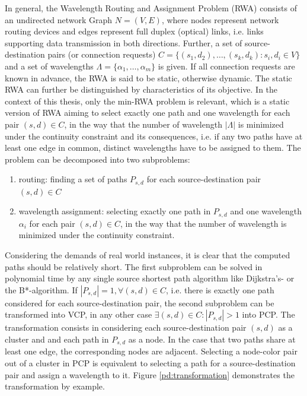 In general, the Wavelength Routing and Assignment Problem (RWA) consists of an undirected network Graph $N=(V,E)$, where nodes represent network routing devices and edges represent full duplex (optical) links, i.e. links supporting data transmission in both directions. Further, a set of source-destination pairs (or connection requests) $C=\{(s_1,d_2),\ldots , (s_k, d_k) : s_i,d_i \in V\}$ and a set of wavelengths $\Lambda = \{\alpha_1 , \ldots, \alpha_m \}$ is given. If all connection requests are known in advance, the RWA is said to be static, otherwise dynamic. \cite{murthy-02} The static RWA can further be distinguished by characteristics of its objective. In the context of this thesis, only the min-RWA problem is relevant, which is a static version of RWA aiming to select exactly one path and one wavelength for each pair $(s,d) \in C$, in the way that the number of wavelength $\left\vert{\Lambda}\right\vert$ is minimized under the continuity constraint and its consequences, i.e. if any two paths have at least one edge in common, distinct wavelengths have to be assigned to them. The problem can be decomposed into two subproblems:

\begin{enumerate}
\item routing: finding a set of paths $P_{s,d}$ for each source-destination pair $(s,d) \in C$
\item wavelength assignment: selecting exactly one path in $P_{s,d}$ and one wavelength $\alpha_i$ for each pair $(s,d) \in C$, in the way that the number of wavelength is minimized under the continuity constraint.
\end{enumerate}

Considering the demands of real world instances, it is clear that the computed paths should be relatively short. The first subproblem can be solved in polynomial time by any single source shortest path algorithm like Dijkstra's- or the B*-algorithm. If $\left\vert{P_{s,d}}\right\vert = 1, \forall (s,d)\in C$, i.e. there is exactly one path considered for each source-destination pair, the second subproblem can be transformed into VCP, in any other case $\exists (s,d)\in C : \left\vert{P_{s,d}}\right\vert > 1$ into PCP. The transformation consists in considering each source-destination pair $(s,d)$ as a cluster and and each path in $P_{s,d}$ as a node. In the case that two paths share at least one edge, the corresponding nodes are adjacent. Selecting a node-color pair out of a cluster in PCP is equivalent to selecting a path for a source-destination pair and assign a wavelength to it. Figure \ref{pd:transformation} demonstrates the transformation by example.


